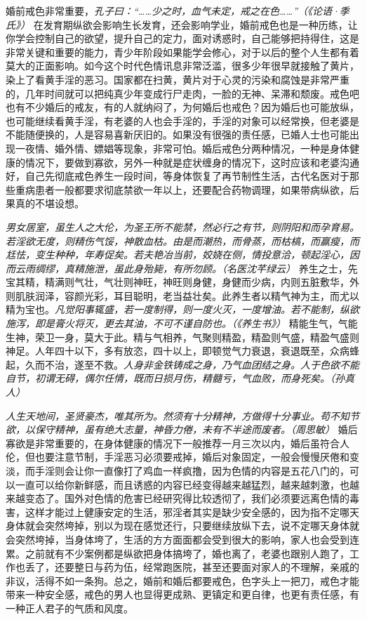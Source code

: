 婚前戒色非常重要，\textit{孔子曰：“……少之时，血气未定，戒之在色……”（《论语·季氏》）} 在发育期纵欲会影响生长发育，还会影响学业，婚前戒色也是一种历练，让你学会控制自己的欲望，提升自己的定力，面对诱惑时，自己能够把持得住，这是非常关键和重要的能力，青少年阶段如果能学会修心，对于以后的整个人生都有着莫大的正面影响。如今这个时代色情讯息非常泛滥，很多少年很早就接触了黄片，染上了看黄手淫的恶习。国家都在扫黄，黄片对于心灵的污染和腐蚀是非常严重的，几年时间就可以把纯真少年变成行尸走肉，一脸的无神、呆滞和颓废。戒色吧也有不少婚后的戒友，有的人就纳闷了，为何婚后也戒色？因为婚后也可能放纵，也可能继续看黄手淫，有老婆的人也会手淫的，手淫的对象可以经常换，但老婆是不能随便换的，人是容易喜新厌旧的。如果没有很强的责任感，已婚人士也可能出现一夜情、婚外情、嫖娼等现象，非常可怕。婚后戒色分两种情况，一种是身体健康的情况下，要做到寡欲，另外一种就是症状缠身的情况下，这时应该和老婆沟通好，自己先彻底戒色养生一段时间，等身体恢复了再节制性生活，古代名医对于那些重病患者一般都要求彻底禁欲一年以上，还要配合药物调理，如果带病纵欲，后果真的不堪设想。

\textit{男女居室，虽生人之大伦，为圣王所不能禁，然必行之有节，则阴阳和而孕育易。若淫欲无度，则精伤气馁，神散血枯。由是而潮热，而骨蒸，而枯槁，而赢瘦，而尪怯，变生种种，年寿促矣。若夫艳冶当前，姣娆在侧，情投意洽，顿起淫心，因而云雨绸缪，真精施泄，虽此身殆毙，有所勿顾。（名医沈芊绿云）} 养生之士，先宝其精，精满则气壮，气壮则神旺，神旺则身健，身健而少病，内则五脏敷华，外则肌肤润泽，容颜光彩，耳目聪明，老当益壮矣。此养生者以精气神为主，而尤以精为宝也。\textit{凡觉阳事辄盛，若一度制得，则一度火灭，一度增油。若不能制，纵欲施泻，即是膏火将灭，更去其油，不可不谨自防也。（《养生书》）} 精能生气，气能生神，荣卫一身，莫大于此。精与气相养，气聚则精盈，精盈则气盛，精盈气盛则神足。人年四十以下，多有放恣，四十以上，即顿觉气力衰退，衰退既至，众病蜂起，久而不治，遂至不救。\textit{人身非金铁铸成之身，乃气血团结之身。人于色欲不能自节，初谓无碍，偶尔任情，既而日损月伤，精髓亏，气血败，而身死矣。（孙真人）}

\textit{人生天地间，圣贤豪杰，唯其所为。然须有十分精神，方做得十分事业。苟不知节欲，以保守精神，虽有绝大志量，神昏力倦，未有不半途而废者。（周思敏）} 婚后寡欲是非常重要的，在身体健康的情况下一般推荐一月三次以内，婚后虽符合人伦，但也要注意节制，手淫恶习必须要戒掉，婚后对象固定，一般会慢慢厌倦和变淡，而手淫则会让你一直像打了鸡血一样疯撸，因为色情的内容是五花八门的，可以一直可以给你新鲜感，而且诱惑的内容已经变得越来越猛烈，越来越刺激，也越来越变态了。国外对色情的危害已经研究得比较透彻了，我们必须要远离色情的毒害，这样才能过上健康安定的生活，邪淫者其实是缺少安全感的，因为指不定哪天身体就会突然垮掉，别以为现在感觉还行，只要继续放纵下去，说不定哪天身体就会突然垮掉，当身体垮了，生活的方方面面都会受到很大的影响，家人也会受到连累。之前就有不少案例都是纵欲把身体搞垮了，婚也离了，老婆也跟别人跑了，工作也丢了，还要整日与药为伍，经常跑医院，甚至还要面对家人的不理解，亲戚的非议，活得不如一条狗。总之，婚前和婚后都要戒色，色字头上一把刀，戒色才能带来一种安全感，戒色的男人也显得更成熟、更镇定和更自律，也更有责任感，有一种正人君子的气质和风度。

